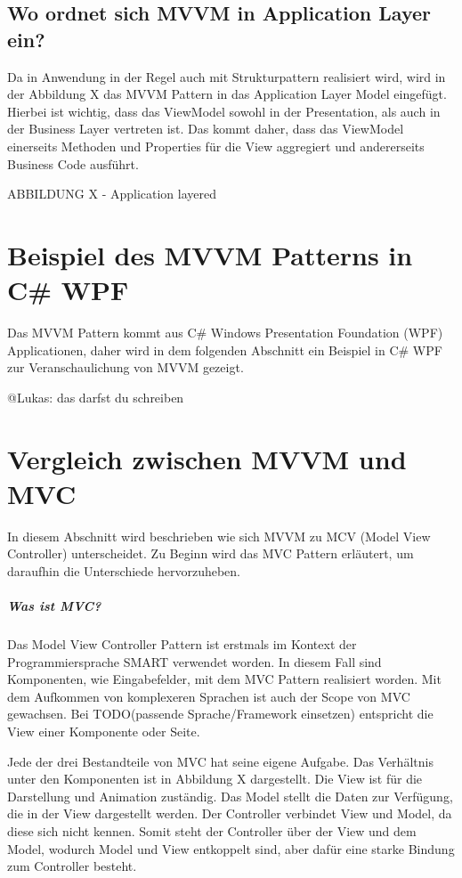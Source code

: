 \documentclass[titlepage=false,12pt]{scrreprt}
\begin{document}
\section{Wo ordnet sich MVVM in Application Layer ein?}

Da in Anwendung in der Regel auch mit Strukturpattern realisiert wird, wird in der Abbildung X
das MVVM Pattern in das Application Layer Model eingefügt. Hierbei ist wichtig, dass das
ViewModel sowohl in der Presentation, als auch in der Business Layer vertreten ist. Das kommt
daher, dass das ViewModel einerseits Methoden und Properties für die View aggregiert und andererseits
Business Code ausführt.  

ABBILDUNG X - Application layered

\chapter{Beispiel des MVVM Patterns in C\# WPF}

Das MVVM Pattern kommt aus C\# Windows Presentation Foundation (WPF) Applicationen, daher
wird in dem folgenden Abschnitt ein Beispiel in C\# WPF zur Veranschaulichung von MVVM gezeigt.


@Lukas: das darfst du schreiben

\chapter{Vergleich zwischen MVVM und MVC}

In diesem Abschnitt wird beschrieben wie sich MVVM zu MCV (Model View Controller) unterscheidet. 
Zu Beginn wird das MVC Pattern erläutert, um daraufhin die Unterschiede hervorzuheben. 

\paragraph{Was ist MVC?}

Das Model View Controller Pattern ist erstmals im Kontext der Programmiersprache SMART verwendet 
worden. In diesem Fall sind Komponenten, wie Eingabefelder, mit dem MVC Pattern realisiert worden.
Mit dem Aufkommen von komplexeren Sprachen ist auch der Scope von MVC gewachsen. Bei TODO(passende Sprache/Framework einsetzen)
entspricht die View einer Komponente oder Seite.

Jede der drei Bestandteile von MVC hat seine eigene Aufgabe. Das Verhältnis unter den Komponenten
ist in Abbildung X dargestellt. Die View ist für die Darstellung und
Animation zuständig. Das Model stellt die Daten zur Verfügung, die in der View dargestellt werden.
Der Controller verbindet View und Model, da diese sich nicht kennen. Somit steht der Controller 
über der View und dem Model, wodurch Model und View entkoppelt sind, aber dafür eine starke Bindung
zum Controller besteht. 
\end{document}
